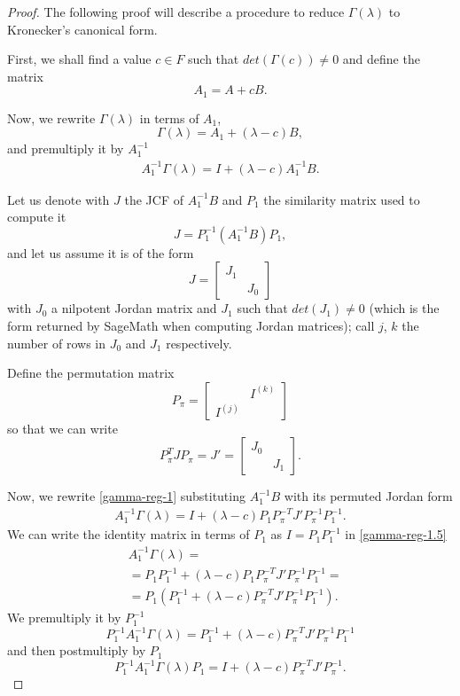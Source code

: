 \begin{proof}
    The following proof will describe a procedure to reduce \(\Gamma(\lambda)\) to Kronecker's canonical form.

    First, we shall find a value \(c \in F\) such that \(det(\Gamma(c)) \neq 0\) and define the matrix 
    \[
        A_{1} = A + cB.
    \]

    Now, we rewrite \(\Gamma(\lambda)\) in terms of \(A_{1}\),
    \[
        \Gamma(\lambda) = A_{1} + (\lambda - c)B,
    \]
    and premultiply it by \(A_{1}^{-1}\)
    \begin{gather}
        A_{1}^{-1} \Gamma(\lambda) = I + (\lambda - c)A_{1}^{-1}B. \label{gamma-reg-1}
    \end{gather}

    Let us denote with \(J\) the JCF of \(A_{1}^{-1}B\) and \(P_{1}\) the similarity matrix used to compute it
    \[
        J = P_{1}^{-1}(A_{1}^{-1}B)P_{1},
    \]
    and let us assume it is of the form
    \[
        J =
        \begin{bmatrix}
            J_{1} & \\
            & J_{0}
        \end{bmatrix}
    \]
    with \(J_{0}\) a nilpotent Jordan matrix and \(J_{1}\) such that \(det(J_{1}) \neq 0\) (which is the form returned by
    SageMath when computing Jordan matrices); call \(j\), \(k\) the number of rows in \(J_{0}\) and \(J_{1}\) respectively.

    Define the permutation matrix
    \[
        P_{\pi} =
        \begin{bmatrix}
            & I^{(k)}\\
            I^{(j)} &
        \end{bmatrix}
    \]
    so that we can write
    \[
        P_{\pi}^T J P_{\pi} = J' =
        \begin{bmatrix}
            J_{0} & \\
            & J_{1}
        \end{bmatrix}.
    \]

    Now, we rewrite \eqref{gamma-reg-1} substituting \(A_{1}^{-1}B\) with its permuted Jordan form
    \begin{gather}
        A_{1}^{-1} \Gamma(\lambda) = I + (\lambda - c)P_{1} P_{\pi}^{-T} J' P_{\pi}^{-1} P_{1}^{-1}.
        \label{gamma-reg-1.5}
    \end{gather}
    We can write the identity matrix in terms of \(P_{1}\) as \(I = P_{1}P_{1}^{-1}\) in \eqref{gamma-reg-1.5}
    \begin{align*}
        & A_{1}^{-1} \Gamma(\lambda) = \\
        &= P_{1}P_{1}^{-1} + (\lambda - c)P_{1} P_{\pi}^{-T} J' P_{\pi}^{-1} P_{1}^{-1} = \\
        &= P_{1}(P_{1}^{-1} + (\lambda - c)P_{\pi}^{-T} J' P_{\pi}^{-1} P_{1}^{-1}).
    \end{align*}
    We premultiply it by \(P_{1}^{-1}\)
    \[
        P_{1}^{-1} A_{1}^{-1} \Gamma(\lambda) = P_{1}^{-1} + (\lambda - c)P_{\pi}^{-T} J' P_{\pi}^{-1} P_{1}^{-1}
    \]
    and then postmultiply by \(P_{1}\)
    \[
        P_{1}^{-1} A_{1}^{-1} \Gamma(\lambda) P_{1} = I + (\lambda - c)P_{\pi}^{-T} J' P_{\pi}^{-1}.
    \]


\end{proof}
